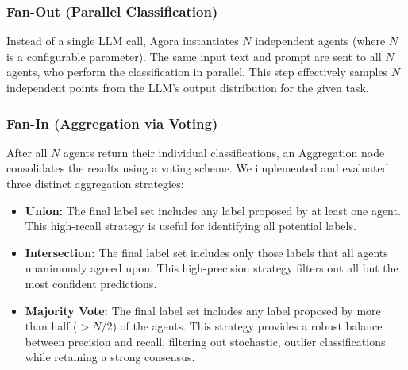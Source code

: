 \subsubsection{Fan-Out (Parallel Classification)}

Instead of a single LLM call, Agora instantiates $N$ independent agents (where $N$ is a configurable parameter). The same input text and prompt are sent to all $N$ agents, who perform the classification in parallel. This step effectively samples $N$ independent points from the LLM's output distribution for the given task.

\subsubsection{Fan-In (Aggregation via Voting)}

After all $N$ agents return their individual classifications, an Aggregation node consolidates the results using a voting scheme. We implemented and evaluated three distinct aggregation strategies:

\begin{itemize}
\item \textbf{Union:} The final label set includes any label proposed by at least one agent. This high-recall strategy is useful for identifying all potential labels.

\item \textbf{Intersection:} The final label set includes only those labels that all agents unanimously agreed upon. This high-precision strategy filters out all but the most confident predictions.

\item \textbf{Majority Vote:} The final label set includes any label proposed by more than half ($> N/2$) of the agents. This strategy provides a robust balance between precision and recall, filtering out stochastic, outlier classifications while retaining a strong consensus.
\end{itemize}

